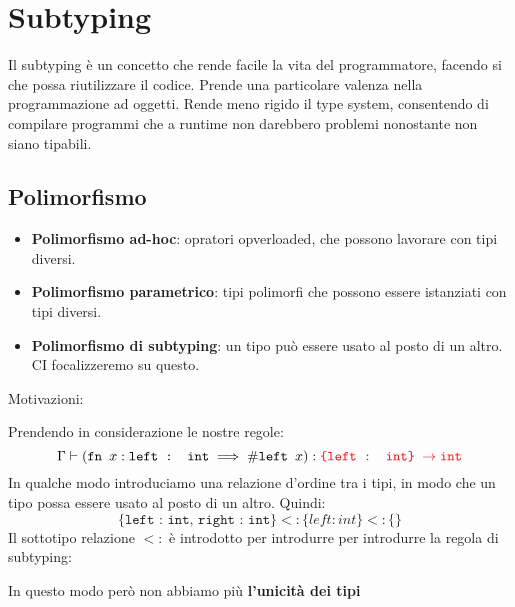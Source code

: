 \chapter{Subtyping}
Il subtyping è un concetto che rende facile la vita del programmatore, 
facendo si che possa riutilizzare il codice. Prende una particolare valenza 
nella programmazione ad oggetti. Rende meno rigido il type system, consentendo 
di compilare programmi che a runtime non darebbero problemi nonostante non siano 
tipabili.
\section{Polimorfismo}
\begin{itemize}
    \item \textbf{Polimorfismo ad-hoc}:
    opratori opverloaded, che possono lavorare con tipi diversi.
    \item \textbf{Polimorfismo parametrico}: tipi polimorfi 
    che possono essere istanziati con tipi diversi.
    \item \textbf{Polimorfismo di subtyping}: un tipo può essere
    usato al posto di un altro. CI focalizzeremo su questo.
\end{itemize}
Motivazioni:
\begin{prooftree}
\end{prooftree}
\begin{prooftree}
\end{prooftree}
Prendendo in considerazione le nostre regole:
\[
\Gamma \vdash (\texttt{fn }x : \texttt{left : int} \implies 
\# \texttt{left }x): \textcolor{red}{\texttt{\{left : int\} }}
\textcolor{red}{\rightarrow \texttt{int}}
\]
In qualche modo introduciamo una relazione d'ordine tra i tipi,
in modo che un tipo possa essere usato al posto di un altro.
Quindi:
\[
  \{\texttt{left : int, right : int}\} <: \{left : int\} <: \{\}  
\]
Il sottotipo relazione $<:$ è introdotto per introdurre per introdurre la regola 
di subtyping:
\begin{prooftree}
\end{prooftree}
In questo modo però non abbiamo più \textbf{l'unicità dei tipi}
